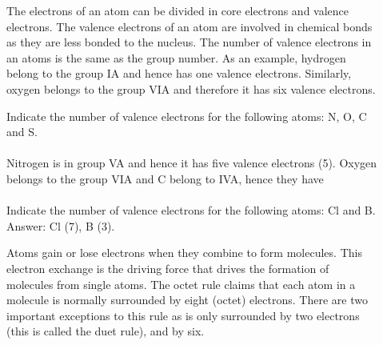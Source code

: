 \documentclass[main.tex]{subfiles}
\begin{document}
\begin{description}
\item[] The electrons of an atom can be divided in core electrons and valence electrons. The valence electrons of an atom are involved in chemical bonds as they are less bonded to the nucleus. The number of valence electrons in an atoms is the same as the group number. As an example, hydrogen  belong to the group IA and hence has one valence electrons. Similarly, oxygen  belongs to the group VIA and therefore it has six valence electrons.

\begin{example} %
Indicate the number of valence electrons for the following atoms: N, O, C and S.\\
\\
Nitrogen is in group VA and hence it has five valence electrons (5). Oxygen belongs to the group VIA and C belong to IVA, hence they have 
\\
\faDiamond\ \\
Indicate the number of valence electrons for the following atoms: Cl and B.\\
\flushright Answer: Cl (7), B (3).
\end{example}%


\item[] Atoms gain or lose electrons when they combine to form molecules. This electron exchange is the driving force that drives the formation of molecules from single atoms. The octet rule claims that each atom in a molecule is normally surrounded by eight (octet) electrons. There are two important exceptions to this rule as  is only surrounded by two electrons (this is called the duet rule), and  by six.


\end{description}
\end{document}
